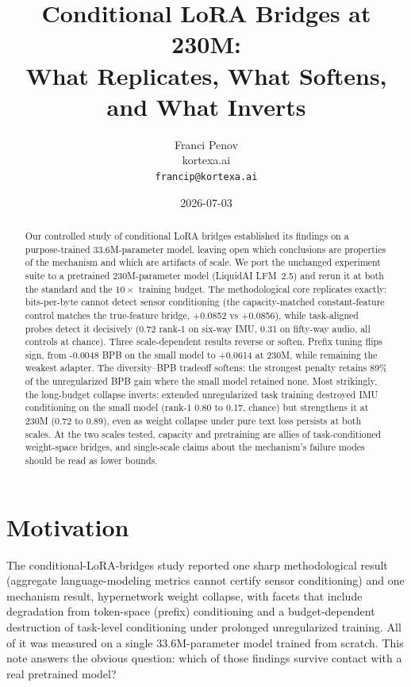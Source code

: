 \documentclass[11pt]{article}
\title{Conditional LoRA Bridges at 230M:\\What Replicates, What Softens, and What Inverts}
\author{Franci Penov \\ kortexa.ai \\ \texttt{francip@kortexa.ai}}
\date{2026-07-03}
\begin{document}
\maketitle

\begin{abstract}
Our controlled study of conditional LoRA bridges \cite{penov2026bridges} established its findings on a purpose-trained 33.6M-parameter model, leaving open which conclusions are properties of the mechanism and which are artifacts of scale. We port the unchanged experiment suite to a pretrained 230M-parameter model (LiquidAI LFM~2.5) and rerun it at both the standard and the $10\times$ training budget. The methodological core replicates exactly: bits-per-byte cannot detect sensor conditioning (the capacity-matched constant-feature control matches the true-feature bridge, +0.0852 vs +0.0856), while task-aligned probes detect it decisively (0.72 rank-1 on six-way IMU, 0.31 on fifty-way audio, all controls at chance). Three scale-dependent results reverse or soften. Prefix tuning flips sign, from -0.0048 BPB on the small model to +0.0614 at 230M, while remaining the weakest adapter. The diversity--BPB tradeoff softens: the strongest penalty retains 89\% of the unregularized BPB gain where the small model retained none. Most strikingly, the long-budget collapse inverts: extended unregularized task training destroyed IMU conditioning on the small model (rank-1 0.80 to 0.17, chance) but strengthens it at 230M (0.72 to 0.89), even as weight collapse under pure text loss persists at both scales. At the two scales tested, capacity and pretraining are allies of task-conditioned weight-space bridges, and single-scale claims about the mechanism's failure modes should be read as lower bounds.
\end{abstract}

\section{Motivation}
The conditional-LoRA-bridges study \cite{penov2026bridges} reported one sharp methodological result (aggregate language-modeling metrics cannot certify sensor conditioning) and one mechanism result, hypernetwork weight collapse, with facets that include degradation from token-space (prefix) conditioning and a budget-dependent destruction of task-level conditioning under prolonged unregularized training. All of it was measured on a single 33.6M-parameter model trained from scratch. This note answers the obvious question: which of those findings survive contact with a real pretrained model?
\end{document}
